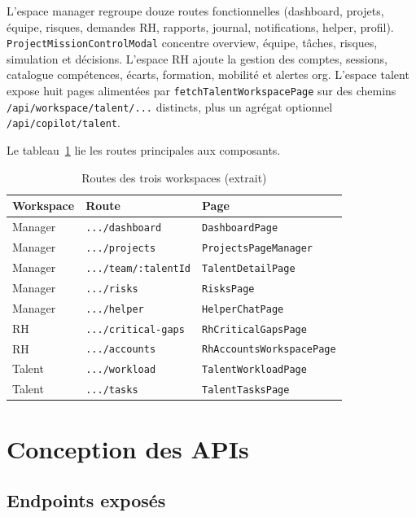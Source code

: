 L'espace manager regroupe douze routes fonctionnelles (dashboard, projets, équipe, risques, demandes RH, rapports, journal, notifications, helper, profil). \texttt{ProjectMissionControlModal} concentre overview, équipe, tâches, risques, simulation et décisions. L'espace RH ajoute la gestion des comptes, sessions, catalogue compétences, écarts, formation, mobilité et alertes org. L'espace talent expose huit pages alimentées par \texttt{fetchTalentWorkspacePage} sur des chemins \texttt{/api/workspace/talent/...} distincts, plus un agrégat optionnel \texttt{/api/copilot/talent}.

Le tableau~\ref{tab:routes-ch4} lie les routes principales aux composants.

\begin{table}[htbp]
\centering
\caption{Routes des trois workspaces (extrait)}
\label{tab:routes-ch4}
\begin{tabular}{@{}lll@{}}
\toprule
\textbf{Workspace} & \textbf{Route} & \textbf{Page} \\
\midrule
Manager & \texttt{.../dashboard} & \texttt{DashboardPage} \\
Manager & \texttt{.../projects} & \texttt{ProjectsPageManager} \\
Manager & \texttt{.../team/:talentId} & \texttt{TalentDetailPage} \\
Manager & \texttt{.../risks} & \texttt{RisksPage} \\
Manager & \texttt{.../helper} & \texttt{HelperChatPage} \\
RH & \texttt{.../critical-gaps} & \texttt{RhCriticalGapsPage} \\
RH & \texttt{.../accounts} & \texttt{RhAccountsWorkspacePage} \\
Talent & \texttt{.../workload} & \texttt{TalentWorkloadPage} \\
Talent & \texttt{.../tasks} & \texttt{TalentTasksPage} \\
\bottomrule
\end{tabular}
\end{table}

\section{Conception des APIs}

\subsection{Endpoints exposés}

